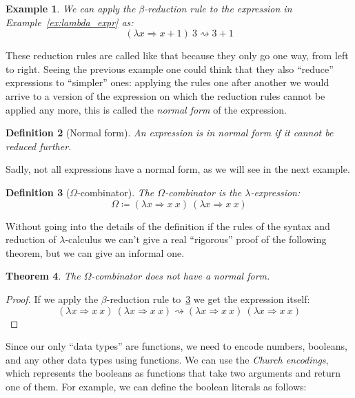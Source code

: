 \documentclass[
  a4paper, 
  10pt, 
  parskip=half, 
  DIV=20,
  toc=bibliography,
  usegeometry,
]{scrartcl}
\newtheorem{theorem}{Theorem}[section]
\newtheorem{definition}[theorem]{Definition}
\newtheorem{example}[theorem]{Example}
\renewcommand{\mapsto}{\Rightarrow}
\begin{document}
\begin{example}
  We can apply the \(\beta\)-reduction rule to the expression in
  Example~\ref{ex:lambda_expr} as:
  \[
  (\lambda x \mapsto x + 1) \ 3 \rightsquigarrow 3 + 1 
  \]
\end{example}

These reduction rules are called like that because they only go one way, from
left to right. Seeing the previous example one could think that they also
\enquote{reduce} expressions to \enquote{simpler} ones: applying the rules one
after another we would arrive to a version of the expression on which the reduction rules cannot 
be applied any more, this is called the \emph{normal form} of the expression.

\begin{definition}[Normal form]
  An expression is in normal form if it cannot be reduced further.
\end{definition}

Sadly, not all expressions have a normal form, as we will see in the next example.

\begin{definition}[\(\Omega\)-combinator]\label{def:omega_combinator}
  The \(\Omega\)-combinator is the \(\lambda\)-expression:
  \[
  \Omega \coloneqq (\lambda x \mapsto x \ x) \ (\lambda x \mapsto x \ x) 
  \]
\end{definition}

Without going into the details of the definition if the rules of the syntax and
reduction of \(\lambda\)-calculus we can't give a real \enquote{rigorous} proof
of the following theorem, but we can give an informal one.

\begin{theorem}
  The \(\Omega\)-combinator does not have a normal form.
\end{theorem}

\begin{proof}
  If we apply the \(\beta\)-reduction rule to~\ref{def:omega_combinator}
  we get the expression itself:
  \[
  (\lambda x \mapsto x \ x) \ (\lambda x \mapsto x \ x) \rightsquigarrow
  (\lambda x \mapsto x \ x) \ (\lambda x \mapsto x \ x)
  \]
\end{proof}

Since our only \enquote{data types} are functions, we need to encode numbers,
booleans, and any other data types using functions. We can use the
\emph{Church encodings}, which represents the booleans as functions that take two
arguments and return one of them. For example, we can define the boolean literals
as follows:
\end{document}
